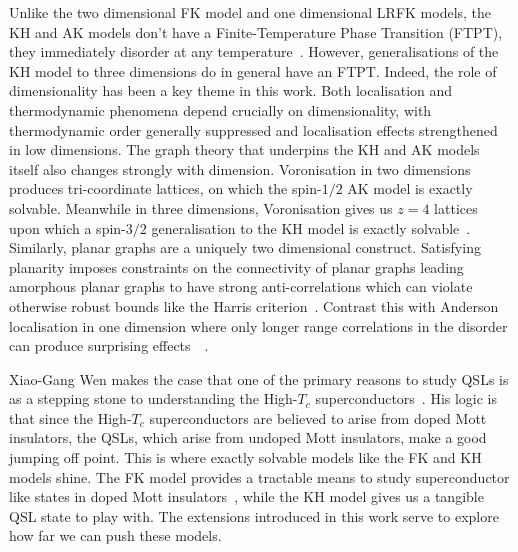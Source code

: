 Unlike the two dimensional FK model and one dimensional LRFK models, the KH and AK models don't have a Finite-Temperature Phase Transition (FTPT), they immediately disorder at any temperature~\autocite{eschmannThermodynamicClassificationThreedimensional2020}. However, generalisations of the KH model to three dimensions do in general have an FTPT. Indeed, the role of dimensionality has been a key theme in this work. Both localisation and thermodynamic phenomena depend crucially on dimensionality, with thermodynamic order generally suppressed and localisation effects strengthened in low dimensions. The graph theory that underpins the KH and AK models itself also changes strongly with dimension. Voronisation in two dimensions produces tri-coordinate lattices, on which the spin-\(1/2\) AK model is exactly solvable. Meanwhile in three dimensions, Voronisation gives us \(z=4\) lattices upon which a spin-\(3/2\) generalisation to the KH model is exactly solvable~\autocite{yaoAlgebraicSpinLiquid2009,wenQuantumOrderStringnet2003,ryuThreedimensionalTopologicalPhase2009}. Similarly, planar graphs are a uniquely two dimensional construct. Satisfying planarity imposes constraints on the connectivity of planar graphs leading amorphous planar graphs to have strong anti-correlations which can violate otherwise robust bounds like the Harris criterion~\autocite{harrisEffectRandomDefects1974}. Contrast this with Anderson localisation in one dimension where only longer range correlations in the disorder can produce surprising effects~~\autocite{aubryAnalyticityBreakingAnderson1980,dassarmaLocalizationMobilityEdges1990,dunlapAbsenceLocalizationRandomdimer1990,izrailevLocalizationMobilityEdge1999,croyAndersonLocalization1D2011,izrailevAnomalousLocalizationLowDimensional2012}.

Xiao-Gang Wen makes the case that one of the primary reasons to study QSLs is as a stepping stone to understanding the High-\(T_c\) superconductors~\autocite{wenQuantumOrdersSymmetric2002}. His logic is that since the High-\(T_c\) superconductors are believed to arise from doped Mott insulators, the QSLs, which arise from undoped Mott insulators, make a good jumping off point. This is where exactly solvable models like the FK and KH models shine. The FK model provides a tractable means to study superconductor like states in doped Mott insulators~\autocite{caiVisualizingEvolutionMott2016}, while the KH model gives us a tangible QSL state to play with. The extensions introduced in this work serve to explore how far we can push these models.

